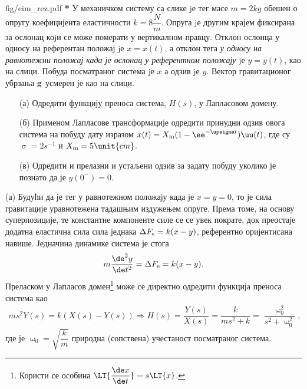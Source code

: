 \begin{slikaDesno}{fig/cim_rez.pdf}
    \textbf{\color{red}*}\PID
    У механичком систему са слике jе тег масе $m = 2\unit{kg}$ 
    обешен о опругу коефицијента
    еластичности $k = 8\unit{\dfrac Nm}$. 
    Опруга jе другим крајем фиксирана за ослонац коjи се може померати
    у вертикалном правцу. Отклон ослонца у односу на референтан положај jе $x = x(t)$,
    а отклон тега \textit{у односу на равнотежни положај када је ослонац у 
    референтном положају} jе
    $y = y(t)$, као на слици. Побуда посматраног система jе $x$ а одзив jе $y$.
    Вектор гравитационог убрзања $\bf g$ усмерен је као на слици.
    \begin{enumerate}
        \item[(а)] Одредити функцију преноса система, $H(s)$, у Лапласовом домену. 
    \end{enumerate}
\end{slikaDesno}
\begin{enumerate}
    \item[(б)] Применом Лапласове трансформације одредити
    принудни одзив овога система на побуду дату изразом
    $x(t) = X_{\rm m} (1 - \ee^{-\upsigma t}) \uu(t)$, где су 
    $\upsigma = 2 \unit{s^{-1}}$ и
    $X_{\rm m} = 5\unit{cm}$. 
    \item[(в)] Одредити и прелазни и устаљени одзив за задату побуду уколико је познато да је 
    $y(0^-) = 0$. 
\end{enumerate}

\RESENJE 
(а) Будући да је тег у равнотежном положају када је $x = y = 0$, то је сила гравитације уравнотежена тадашњим издужењем опруге. 
Према томе, на основу суперпозиције, те константне компоненте силе се се увек пократе, док преостаје додатна еластична сила
сила једнака $\Delta F_{\rm e} = k(x - y)$, референтно оријентисана навише. Једначина динамике система је стога 
\begin{equation}
    m \dfrac{\de^2 y}{\de t^2} = \Delta F_{\rm e} = k(x - y). 
\end{equation}
Преласком у Лапласов домен\footnote{Користи се особина $\LT{ \dfrac{\de x}{\de t} } = s \LT{x}$. } може се 
директно одредити функција преноса система као 
\begin{eqnarray}
    ms^2 Y(s) = k( X(s) - Y(s) ) 
    \Rightarrow
    H(s) = \dfrac{Y(s)}{X(s)} = \dfrac{k}{ms^2 + k} = \dfrac{\upomega_0^2}{s^2 + \upomega_0^2},
\end{eqnarray}
где је $\upomega_0 = \sqrt{\dfrac{k}{m}}$ природна (сопствена) учестаност посматраног система. 

